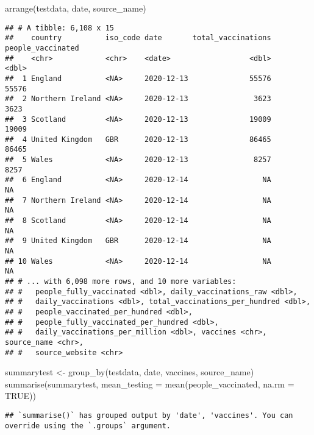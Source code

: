 \documentclass[
]{article}
\newenvironment{Shaded}{\begin{snugshade}}{\end{snugshade}}
\newcommand{\AttributeTok}[1]{\textcolor[rgb]{0.77,0.63,0.00}{#1}}
\newcommand{\ConstantTok}[1]{\textcolor[rgb]{0.00,0.00,0.00}{#1}}
\newcommand{\FunctionTok}[1]{\textcolor[rgb]{0.00,0.00,0.00}{#1}}
\newcommand{\NormalTok}[1]{#1}
\newcommand{\OtherTok}[1]{\textcolor[rgb]{0.56,0.35,0.01}{#1}}
\begin{document}
\begin{Shaded}
\begin{Highlighting}[]
\FunctionTok{arrange}\NormalTok{(testdata, date, source\_name)}
\end{Highlighting}
\end{Shaded}

\begin{verbatim}
## # A tibble: 6,108 x 15
##    country          iso_code date       total_vaccinations people_vaccinated
##    <chr>            <chr>    <date>                  <dbl>             <dbl>
##  1 England          <NA>     2020-12-13              55576             55576
##  2 Northern Ireland <NA>     2020-12-13               3623              3623
##  3 Scotland         <NA>     2020-12-13              19009             19009
##  4 United Kingdom   GBR      2020-12-13              86465             86465
##  5 Wales            <NA>     2020-12-13               8257              8257
##  6 England          <NA>     2020-12-14                 NA                NA
##  7 Northern Ireland <NA>     2020-12-14                 NA                NA
##  8 Scotland         <NA>     2020-12-14                 NA                NA
##  9 United Kingdom   GBR      2020-12-14                 NA                NA
## 10 Wales            <NA>     2020-12-14                 NA                NA
## # ... with 6,098 more rows, and 10 more variables:
## #   people_fully_vaccinated <dbl>, daily_vaccinations_raw <dbl>,
## #   daily_vaccinations <dbl>, total_vaccinations_per_hundred <dbl>,
## #   people_vaccinated_per_hundred <dbl>,
## #   people_fully_vaccinated_per_hundred <dbl>,
## #   daily_vaccinations_per_million <dbl>, vaccines <chr>, source_name <chr>,
## #   source_website <chr>
\end{verbatim}

\begin{Shaded}
\begin{Highlighting}[]
\NormalTok{summarytest }\OtherTok{\textless{}{-}} \FunctionTok{group\_by}\NormalTok{(testdata, date, vaccines, source\_name)}
\FunctionTok{summarise}\NormalTok{(summarytest, }\AttributeTok{mean\_testing =} \FunctionTok{mean}\NormalTok{(people\_vaccinated, }\AttributeTok{na.rm =} \ConstantTok{TRUE}\NormalTok{))}
\end{Highlighting}
\end{Shaded}

\begin{verbatim}
## `summarise()` has grouped output by 'date', 'vaccines'. You can override using the `.groups` argument.
\end{verbatim}
\end{document}
